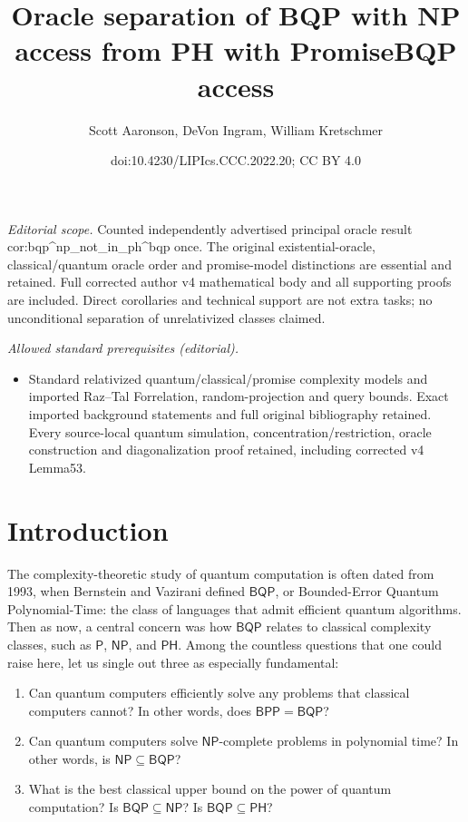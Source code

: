 \documentclass[10pt,a4paper]{article}
\title{Oracle separation of BQP with NP access from PH with PromiseBQP access}
\author{Scott Aaronson, DeVon Ingram, William Kretschmer}
\date{doi:10.4230/LIPIcs.CCC.2022.20; CC BY 4.0}
\begin{document}
\maketitle
\noindent\textit{Editorial scope.} Counted independently advertised principal oracle result cor:bqp\textasciicircum{}np\_not\_in\_ph\textasciicircum{}bqp once. The original existential-oracle, classical/quantum oracle order and promise-model distinctions are essential and retained. Full corrected author v4 mathematical body and all supporting proofs are included. Direct corollaries and technical support are not extra tasks; no unconditional separation of unrelativized classes claimed.\par\medskip
\noindent\textit{Allowed standard prerequisites (editorial).}\begin{itemize}
\item Standard relativized quantum/classical/promise complexity models and imported Raz–Tal Forrelation, random-projection and query bounds. Exact imported background statements and full original bibliography retained. Every source-local quantum simulation, concentration/restriction, oracle construction and diagonalization proof retained, including corrected v4 Lemma53.
\end{itemize}\medskip
\section{Introduction\label{INTRO}}

The complexity-theoretic study of quantum computation is often dated from 1993, when Bernstein and Vazirani \cite{BV97} defined $\mathsf{BQP}$, or Bounded-Error Quantum Polynomial-Time: the class of languages that admit efficient quantum algorithms.  Then as now, a central concern was how $\mathsf{BQP}$ relates to classical complexity classes, such as $\mathsf{P}$, $\mathsf{NP}$, and $\mathsf{PH}$.  Among the countless questions that one could raise here, let us single out three as especially fundamental:
\begin{enumerate}[(1)]
\item Can quantum computers efficiently solve any problems that classical computers cannot?  In other words, does $\mathsf{BPP}= \mathsf{BQP}$?
\item Can quantum computers solve $\mathsf{NP}$-complete problems in polynomial time?  In other words, is $\mathsf{NP} \subseteq \mathsf{BQP}$?
\item What is the best classical upper bound on the power of quantum computation?  Is $\mathsf{BQP} \subseteq \mathsf{NP}$?  Is $\mathsf{BQP} \subseteq \mathsf{PH}$?
\end{enumerate}
\end{document}
